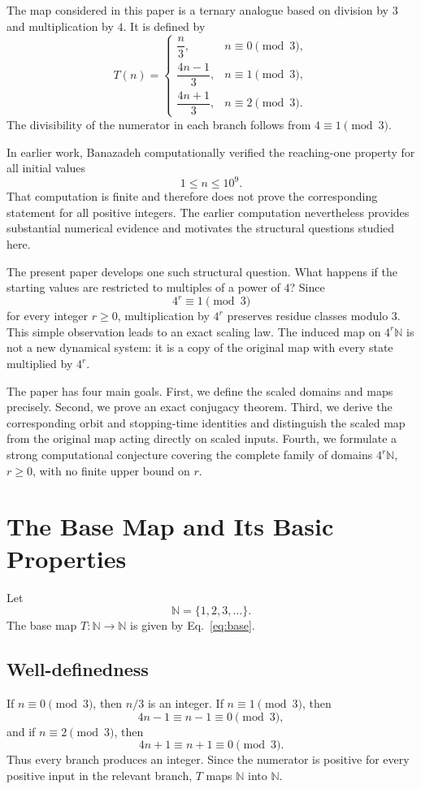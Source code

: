 \documentclass[11pt]{article}
\newcommand{\N}{\mathbb{N}}
\begin{document}
The map considered in this paper is a ternary analogue based on division by $3$ and multiplication by $4$. It is defined by
\begin{equation}
T(n)=\begin{cases}
\dfrac{n}{3},&n\equiv0\pmod3,\\[5pt]
\dfrac{4n-1}{3},&n\equiv1\pmod3,\\[5pt]
\dfrac{4n+1}{3},&n\equiv2\pmod3.
\end{cases}
\label{eq:base}
\end{equation}
The divisibility of the numerator in each branch follows from $4\equiv1\pmod3$.

In earlier work, Banazadeh computationally verified the reaching-one property for all initial values
\[
1\le n\le10^9.
\]
That computation is finite and therefore does not prove the corresponding statement for all positive integers. The earlier computation nevertheless provides substantial numerical evidence and motivates the structural questions studied here.

The present paper develops one such structural question. What happens if the starting values are restricted to multiples of a power of $4$? Since
\[
4^r\equiv1\pmod3
\]
for every integer $r\ge0$, multiplication by $4^r$ preserves residue classes modulo $3$. This simple observation leads to an exact scaling law. The induced map on $4^r\N$ is not a new dynamical system: it is a copy of the original map with every state multiplied by $4^r$.

The paper has four main goals. First, we define the scaled domains and maps precisely. Second, we prove an exact conjugacy theorem. Third, we derive the corresponding orbit and stopping-time identities and distinguish the scaled map from the original map acting directly on scaled inputs. Fourth, we formulate a strong computational conjecture covering the complete family of domains $4^r\N$, $r\ge0$, with no finite upper bound on $r$.

\section{The Base Map and Its Basic Properties}
Let
\[
\N=\{1,2,3,\ldots\}.
\]
The base map $T:\N\to\N$ is given by Eq.~\eqref{eq:base}.

\subsection{Well-definedness}
If $n\equiv0\pmod3$, then $n/3$ is an integer. If $n\equiv1\pmod3$, then
\[
4n-1\equiv n-1\equiv0\pmod3,
\]
and if $n\equiv2\pmod3$, then
\[
4n+1\equiv n+1\equiv0\pmod3.
\]
Thus every branch produces an integer. Since the numerator is positive for every positive input in the relevant branch, $T$ maps $\N$ into $\N$.
\end{document}
